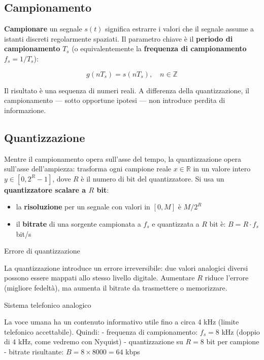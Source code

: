 \documentclass[
  italian,
  openany]{book}
\providecommand{\tightlist}{%
  \setlength{\itemsep}{0pt}\setlength{\parskip}{0pt}}
\begin{document}
\subsection{Campionamento}\label{campionamento}

\textbf{Campionare} un segnale \(s(t)\) significa estrarre i valori che
il segnale assume a istanti discreti regolarmente spaziati. Il parametro
chiave è il \textbf{periodo di campionamento} \(T_s\) (o
equivalentemente la \textbf{frequenza di campionamento}
\(f_s = 1/T_s\)):

\[g(nT_s) = s(nT_s), \quad n \in \mathbb{Z}\]

Il risultato è una sequenza di numeri reali. A differenza della
quantizzazione, il campionamento --- sotto opportune ipotesi --- non
introduce perdita di informazione.

\subsection{Quantizzazione}\label{quantizzazione}

Mentre il campionamento opera sull'asse del tempo, la quantizzazione
opera sull'asse dell'ampiezza: trasforma ogni campione reale
\(x \in \mathbb{R}\) in un valore intero \(y \in [0, 2^R - 1]\), dove
\(R\) è il numero di bit del quantizzatore. Si usa un
\textbf{quantizzatore scalare a \(R\) bit}:

\begin{itemize}
\tightlist
\item
  la \textbf{risoluzione} per un segnale con valori in \([0, M]\) è
  \(M / 2^R\)
\item
  il \textbf{bitrate} di una sorgente campionata a \(f_s\) e quantizzata
  a \(R\) bit è: \(B = R \cdot f_s\) bit/s
\end{itemize}

\begin{calloutwarning}{Errore di quantizzazione}

La quantizzazione introduce un errore irreversibile: due valori
analogici diversi possono essere mappati allo stesso livello digitale.
Aumentare \(R\) riduce l'errore (migliore fedeltà), ma aumenta il
bitrate da trasmettere o memorizzare.

\end{calloutwarning}

\begin{callouttip}{Sistema telefonico analogico}

La voce umana ha un contenuto informativo utile fino a circa 4 kHz
(limite telefonico accettabile). Quindi: - frequenza di campionamento:
\(f_s = 8\) kHz (doppio di 4 kHz, come vedremo con Nyquist) -
quantizzazione su \(R = 8\) bit per campione - bitrate risultante:
\(B = 8 \times 8000 = 64\) kbps

\end{callouttip}
\end{document}
